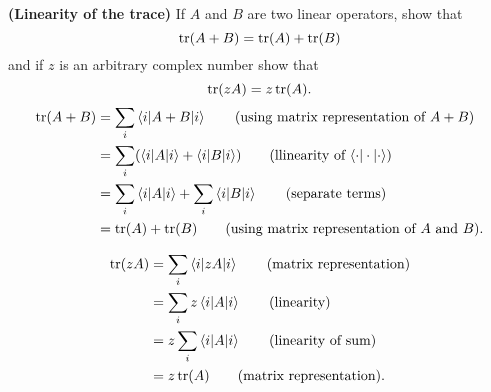  \textbf{(Linearity of the trace)} If $A$ and $B$ are two linear operators, show that $$\operatorname{tr}(A+B)=\operatorname{tr}(A)+\operatorname{tr}(B)$$ and if $z$ is an arbitrary complex number show that $$\operatorname{tr}(zA) = z\operatorname{tr}(A).$$
\Soln
\begin{align*}
	\Tr (A + B) &= \sum_i \braket{i | A+B | i}  \tag{using matrix representation of $A+B$}\\
		&= \sum_i (\braket{i|A|i}  + \braket{i | B | i}  ) \tag{llinearity of $\braket{\cdot|\cdot|\cdot}$}\\
		&= \sum_i \braket{i|A|i} + \sum_i \braket{i|B|i} \tag{separate terms}\\
		&= \Tr (A) + \Tr (B) \tag{using matrix representation of $A$ and $B$}.
\end{align*}

\begin{align*}
	\operatorname{tr} (z A) &=  \sum_i \braket{i | z A | i} \tag{matrix representation}\\
		&= \sum_i z \braket{i | A | i} \tag{linearity}\\
		&= z \sum_i \braket{i | A | i}\tag{linearity of sum}\\
		&= z \operatorname{tr} (A) \tag{matrix representation}.
\end{align*}


